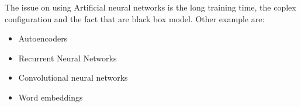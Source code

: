  The issue on using Artificial neural networks is the long training time, the coplex configuration and the fact that are black box model.
 Other example are: 
 \begin{itemize}
     \item Autoencoders
     \item Recurrent Neural Networks
     \item Convolutional neural networks
     \item Word embeddings
 \end{itemize}